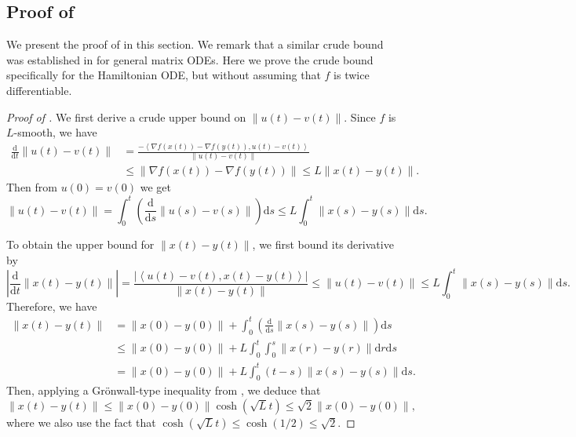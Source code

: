 \documentclass{toc}
\newcommand{\dif}{\mathrm{d}}
\newcommand{\norm}[1]{\left\lVert #1 \right\rVert}
\newcommand{\ip}[2]{\left\langle #1 , #2 \right\rangle}
\newcommand{\grad}{\nabla}
\begin{document}
\subsection{Proof of }
\label{subsec:proof_claim}
%
We present the proof of  in this section. We remark that a similar crude bound was established in \cite{LSV18} for general matrix ODEs. Here we prove the crude bound specifically for the Hamiltonian ODE, but without assuming that $f$ is twice differentiable.
\begin{proof}[Proof of ]
	We first derive a crude upper bound on $\norm{u(t)-v(t)}$. Since $f$ is $L$-smooth, we have 
	\begin{align*}
		\frac{\dif}{\dif t} \norm{u(t)-v(t)} 
		&= \frac{- \ip{\grad f(x(t)) - \grad f(y(t))}{u(t)-v(t)}}{\norm{u(t)-v(t)}}\\
		&\le \norm{\grad f(x(t)) - \grad f(y(t))} 
		\le L \norm{x(t)-y(t)}.
	\end{align*}
	Then from $u(0) = v(0)$ we get
	\[
	\norm{u(t)-v(t)} = \int_{0}^t \left( \frac{\dif}{\dif s} \norm{u(s)-v(s)} \right) \dif s \le L \int_{0}^t \norm{x(s)-y(s)} \dif s.
	\]
	
	To obtain the upper bound for $\norm{x(t)-y(t)}$, we first bound its derivative by
	\begin{equation}\label{eqn:abs_deri_x-y}
	\left| \frac{\dif}{\dif t} \norm{x(t)-y(t)} \right| = \frac{\left| \ip{u(t)-v(t)}{x(t)-y(t)} \right|}{\norm{x(t)-y(t)}} \le \norm{u(t)-v(t)} \le L \int_{0}^t \norm{x(s)-y(s)} \dif s.
	\end{equation}
	Therefore, we have
	\begin{align*}
		\norm{x(t)-y(t)} &= \norm{x(0) - y(0)} + \int_{0}^t \left( \frac{\dif}{\dif s} \norm{x(s)-y(s)} \right) \dif s\\ 
		&\le \norm{x(0) - y(0)} + L \int_{0}^t \int_{0}^s \norm{x(r)-y(r)} \dif r \dif s\\
		&= \norm{x(0) - y(0)} + L \int_{0}^t (t-s) \norm{x(s)-y(s)} \dif s.
	\end{align*}
	Then, applying a Gr\"{o}nwall-type inequality from \cite[Lemma A.5]{LSV18}, we deduce that
	\begin{equation}\label{eqn:upper_norm_x-y}
	\norm{x(t)-y(t)} \le \norm{x(0) - y(0)} \cosh\left( \sqrt{L}t \right) \le \sqrt{2} \norm{x(0) - y(0)},
	\end{equation}
	where we also use the fact that $\cosh(\sqrt{L} t) \leq \cosh(1/2) \le \sqrt{2}$.
	

\end{proof}
\end{document}
